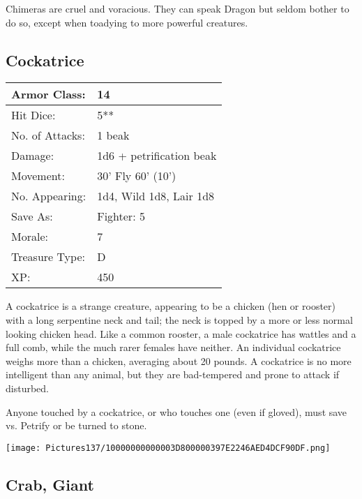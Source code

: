 \documentclass[a4paper,twoside,openany,10pt]{book}
\begin{document}
\begin{multicols}{2}
Chimeras are cruel and voracious. They can speak Dragon but seldom bother to do so, except when toadying to more powerful creatures.

\subsection*{Cockatrice}\label{cockatrice}


\begin{tabularx}{0.48\textwidth}{@{}lX@{}}
Armor Class: & 14 \\\hline
Hit Dice: & 5** \\\hline
No. of Attacks: & 1 beak \\\hline
Damage: & 1d6 + petrification beak \\\hline
Movement: & 30' Fly 60'
(10') \\\hline
No. Appearing: & 1d4, Wild 1d8, Lair 1d8 \\\hline
Save As: & Fighter: 5 \\\hline
Morale: & 7 \\\hline
Treasure Type: & D \\\hline
XP: & 450 \\\hline
\end{tabularx}\medskip

A cockatrice is a strange creature, appearing to be a chicken (hen or rooster) with a long serpentine neck and tail; the neck is topped by a more or less normal looking chicken head. Like a common rooster, a male cockatrice has wattles and a full comb, while the much rarer females have neither. An individual cockatrice weighs more than a chicken, averaging about 20 pounds. A cockatrice is no more intelligent than any animal, but they are bad-tempered and prone to attack if disturbed.

Anyone touched by a cockatrice, or who touches one (even if gloved), must save vs. Petrify or be turned to stone.

\begin{center}
	\texttt{[image: Pictures137/10000000000003D800000397E2246AED4DCF90DF.png]}
\end{center}


\subsection*{Crab, Giant}\label{crab-giant}


\end{multicols}
\end{document}
